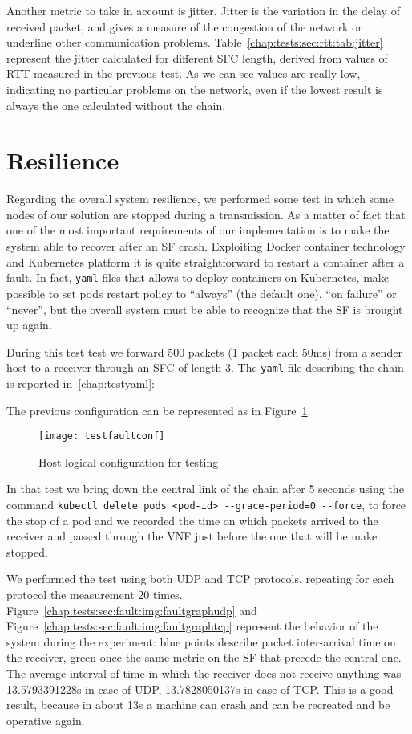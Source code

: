Another metric to take in account is jitter. Jitter is the variation in the
delay of received packet, and gives a measure of the congestion of the network
or underline other communication problems.
Table~\ref{chap:tests:sec:rtt:tab:jitter} represent the jitter calculated for
different SFC length, derived from values of RTT measured in the previous test.
As we can see values are really low, indicating no particular problems on the
network, even if the lowest result is always the one calculated without the
chain.

\section{Resilience}
Regarding the overall system resilience, we performed some test in which some
nodes of our solution are stopped during a transmission. As a matter of fact
that one of the most important requirements of our implementation is to make
the system  able to recover after an SF crash. Exploiting Docker container
technology and Kubernetes platform it is quite straightforward to restart a
container after a fault. In fact, \texttt{yaml} files that allows to deploy
containers on Kubernetes, make possible to set pods restart policy to
``always'' (the default one), ``on failure'' or ``never'', but the overall
system must be able to recognize that the SF is brought up again. 

During this test test we forward 500 packets (1 packet each 50ms) from a sender
host to a receiver through an SFC of length 3. The \texttt{yaml} file
describing the chain is reported in~\ref{chap:testyaml}:

The previous configuration can be represented as in
Figure~\ref{chap:tests:sec:fault:img:testfaultconf}.
\begin{figure}[H]
  \centering
  \texttt{[image: testfaultconf]}
  \caption{Host logical configuration for testing}
  \label{chap:tests:sec:fault:img:testfaultconf}
\end{figure}

In that test we bring down the central link of the chain after 5 seconds using
the command \verb!kubectl delete pods <pod-id> --grace-period=0 --force!, to
force the stop of a pod and we recorded the time on which packets arrived to
the receiver and passed through the VNF just before the one that will be make
stopped.

We performed the test using both UDP and TCP protocols, repeating for each
protocol the measurement 20 times.
Figure~\ref{chap:tests:sec:fault:img:faultgraphudp} and
Figure~\ref{chap:tests:sec:fault:img:faultgraphtcp} represent the behavior of
the system during the experiment: blue points describe packet inter-arrival
time on the receiver, green once the same metric on the SF that precede the
central one. The average interval of time in which the
receiver does not receive anything was 13.5793391228s in case of UDP,
13.7828050137s in case of TCP. This is a good result, because in about 13s a
machine can crash and can be recreated and be operative again. 

